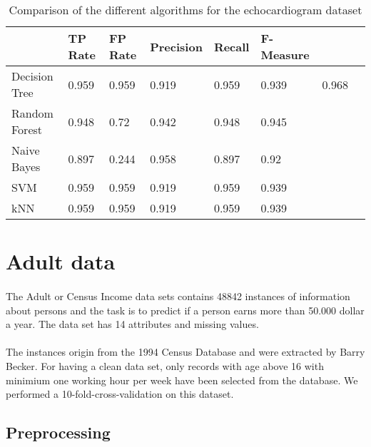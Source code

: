 \documentclass[paper=a4, fontsize=11pt]{scrartcl} %
\numberwithin{equation}{section} %
\numberwithin{figure}{section} %
\numberwithin{table}{section} %
\begin{document}
\begin{table}[h]
\centering
\begin{tabular}{llllllll}
	\toprule
									&TP Rate   	&FP Rate   &Precision &Recall  &F-Measure \\
	\midrule
	Decision Tree &  0.959   & 0.959   & 0.919     & 0.959  & 0.939     &    0.968     \\ 
  Random Forest &		 0.948   &  0.72    &  0.942     &  0.948  &  0.945             \\ 
  Naive Bayes			&   0.897  & 0.244   & 0.958     & 0.897  & 0.92     \\
  SVM							&0.959     	&0.959     	&0.919   	&0.959   &0.939    \\
  kNN							&0.959     	&0.959     	&0.919   	&0.959   &0.939    \\
	\bottomrule
\end{tabular}
\caption{Comparison of the different algorithms for the echocardiogram dataset}
\end{table}







\section{Adult data}

\paragraph{}The Adult or Census Income data sets contains 48842 instances of information about persons and the task is to predict if a person earns more than 50.000 dollar a year. The data set has 14 attributes and missing values.

\paragraph{}The instances origin from the 1994 Census Database and were extracted by Barry Becker. For having a clean data set, only records with age above 16 with minimium one working hour per week have been selected from the database. We performed a 10-fold-cross-validation on this dataset.

\subsection{Preprocessing}
\end{document}
